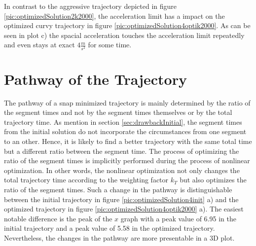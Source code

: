In contrast to the aggressive trajectory depicted in figure \ref{pic:optimizedSolution2k2000}, the acceleration limit has a impact on the optimized curvy trajectory in figure \ref{pic:optimizedSolution4optik2000}. As can be seen in plot c) the spacial acceleration touches the acceleration limit repeatedly and even stays at exact $4 \frac{m}{s^2}$ for some time. 

\section{Pathway of the Trajectory}\label{sec:pathway}

The pathway of a snap minimized trajectory is mainly determined by the ratio of the segment times and not by the segment times themselves or by the total trajectory time. As mention in section \ref{sec:drawbackInitial}, the segment times from the initial solution do not incorporate the circumstances from one segment to an other. Hence, it is likely to find a better trajectory with the same total time but a different ratio between the segment time. The process of optimizing the ratio of the segment times is implicitly performed during the process of nonlinear optimization. In other words, the nonlinear optimization not only changes the total trajectory time according to the weighting factor $k_T$ but also optimizes the ratio of the segment times. \newline
Such a change in the pathway is distinguishable between the initial trajectory in figure \ref{pic:optimizedSolution4init} a) and the optimized trajectory in figure \ref{pic:optimizedSolution4optik2000} a). The easiest notable difference is the peak of the $x$ graph with a peak value of 6.95 in the initial trajectory and a peak value of 5.58 in the optimized trajectory. Nevertheless, the changes in the pathway are more presentable in a 3D plot. 


